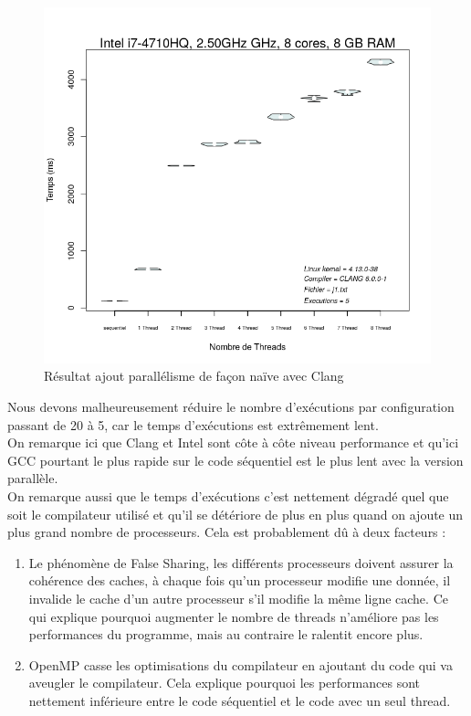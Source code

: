 \documentclass[
 aip,
 jmp,
 amsmath,amssymb,
 reprint
]{revtex4-1}
\begin{document}
\begin{figure}[H]
  \includegraphics[width=\linewidth, keepaspectratio=true]{clang_parallel_naif.png}
  \caption{Résultat ajout parallélisme de façon naïve avec Clang\label{Fig:clang_naif}}
\end{figure}

Nous devons malheureusement réduire le nombre d'exécutions par configuration passant de 20 à 5, car le temps d'exécutions est extrêmement lent.\\
On remarque ici que Clang et Intel sont côte à côte niveau performance et qu'ici GCC pourtant le plus rapide sur le code séquentiel est le plus lent avec la version parallèle.\\
On remarque aussi que le temps d'exécutions c'est nettement dégradé quel que soit le compilateur utilisé et qu'il se détériore de plus en plus quand on ajoute un plus grand nombre de processeurs. Cela est probablement dû à deux facteurs : 
\begin{enumerate}
\item Le phénomène de False Sharing, les différents processeurs doivent assurer la cohérence des caches, à chaque fois qu'un processeur modifie une donnée, il invalide le cache d'un autre processeur s'il modifie la même ligne cache. Ce qui explique pourquoi augmenter le nombre de threads n'améliore pas les performances du programme, mais au contraire le ralentit encore plus.
\item OpenMP casse les optimisations du compilateur en ajoutant du code qui va aveugler le compilateur. Cela explique pourquoi les performances sont nettement inférieure entre le code séquentiel et le code avec un seul thread.
\end{enumerate}
\end{document}
